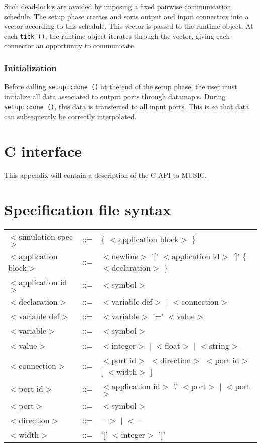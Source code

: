 \documentclass[a4paper]{report}
\begin{document}
\begin{metatext}
Such dead-lock:s are avoided by imposing a fixed pairwise
communication schedule.  The setup phase creates and sorts output and
input connectors into a vector according to this schedule.  This
vector is passed to the runtime object.  At each \lstinline|tick ()|, the
runtime object iterates through the vector, giving each connector an
opportunity to communicate.

\subsection{Initialization}

Before calling \lstinline|setup::done ()| at the end of the setup phase,
the user must initialize all data associated to output ports through
datamap:s.  During \lstinline|setup::done ()|, this data is transferred to
all input ports.  This is so that data can subsequently be correctly
interpolated.
\end{metatext}

\appendix

\chapter{C interface}
This appendix will contain a description of the C API to MUSIC.

\chapter{Specification file syntax}
\label{sec:specsyntax}

\newcommand{\nt}[1]{$<$#1$>$}

\begin{tabular}{lcl}
\nt{simulation spec}   & ::= & \{ \nt{application block} \} \\
\nt{application block} & ::= & \nt{newline} '[' \nt{application id} ']' \{ \nt{declaration}
\} \\
\nt{application id}    & ::= & \nt{symbol} \\
\nt{declaration}       & ::= & \nt{variable def} $|$ \nt{connection} \\
\nt{variable def}      & ::= & \nt{variable} '=' \nt{value} \\
\nt{variable}	       & ::= & \nt{symbol} \\
\nt{value} 	       & ::= & \nt{integer} $|$ \nt{float} $|$ \nt{string} \\
\nt{connection}	       & ::= & \nt{port id} \nt{direction} \nt{port id} [ \nt{width} ] \\
\nt{port id}	       & ::= & \nt{application id} '.' \nt{port} $|$
\nt{port} \\
\nt{port}	       & ::= & \nt{symbol} \\
\nt{direction}	       & ::= & $->$ $|$ $<-$ \\
\nt{width}	       & ::= & '[' \nt{integer} ']' \\
\end{tabular}

\printindex
\end{document}
